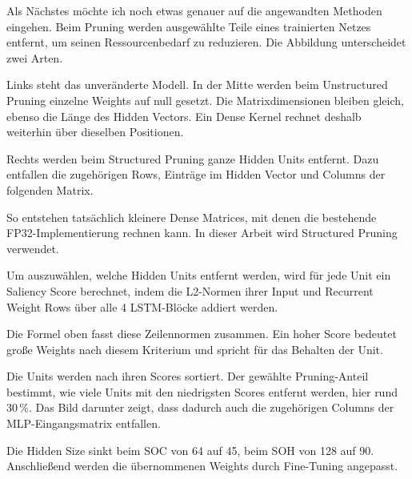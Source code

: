 \begin{sprechtext}

Als Nächstes möchte ich noch etwas genauer auf die angewandten Methoden eingehen. Beim Pruning werden ausgewählte Teile eines trainierten Netzes entfernt, um seinen Ressourcenbedarf zu reduzieren. Die Abbildung unterscheidet zwei Arten.

Links steht das unveränderte Modell. In der Mitte werden beim Unstructured Pruning einzelne Weights auf null gesetzt. Die Matrixdimensionen bleiben gleich, ebenso die Länge des Hidden Vectors. Ein Dense Kernel rechnet deshalb weiterhin über dieselben Positionen.

Rechts werden beim Structured Pruning ganze Hidden Units entfernt. Dazu entfallen die zugehörigen Rows, Einträge im Hidden Vector und Columns der folgenden Matrix.

So entstehen tatsächlich kleinere Dense Matrices, mit denen die bestehende FP32-Implementierung rechnen kann. In dieser Arbeit wird Structured Pruning verwendet.

\end{sprechtext}


\begin{sprechtext}

Um auszuwählen, welche Hidden Units entfernt werden, wird für jede Unit ein Saliency Score berechnet, indem die L2-Normen ihrer Input und Recurrent Weight Rows über alle 4 LSTM-Blöcke addiert werden.

Die Formel oben fasst diese Zeilennormen zusammen. Ein hoher Score bedeutet große Weights nach diesem Kriterium und spricht für das Behalten der Unit.

Die Units werden nach ihren Scores sortiert. Der gewählte Pruning-Anteil bestimmt, wie viele Units mit den niedrigsten Scores entfernt werden, hier rund 30\,\%. Das Bild darunter zeigt, dass dadurch auch die zugehörigen Columns der MLP-Eingangsmatrix entfallen.

Die Hidden Size sinkt beim SOC von 64 auf 45, beim SOH von 128 auf 90. Anschließend werden die übernommenen Weights durch Fine-Tuning angepasst.

\end{sprechtext}


